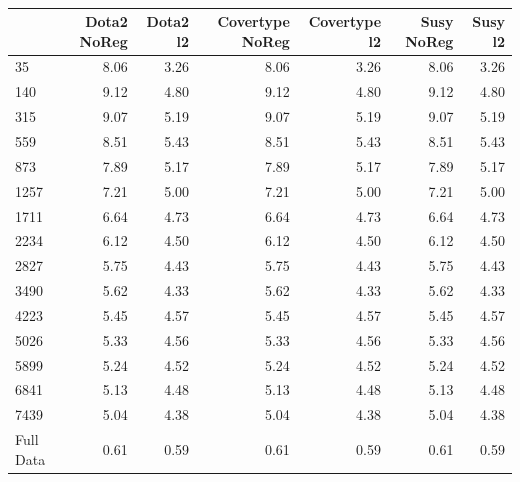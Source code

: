             \begin{table}[!htb]
                \centering
                \caption{}
                \label{tab:std_std_005}
                \begin{tabular}{l||rr|rr|rr}
                \toprule
                {} &  Dota2 NoReg &  Dota2 l2 &  Covertype NoReg &  Covertype l2 &  Susy NoReg &  Susy l2 \\
                \midrule
                35    &         8.06 &      3.26 &             8.06 &          3.26 &        8.06 &     3.26 \\
                140   &         9.12 &      4.80 &             9.12 &          4.80 &        9.12 &     4.80 \\
                315   &         9.07 &      5.19 &             9.07 &          5.19 &        9.07 &     5.19 \\
                559   &         8.51 &      5.43 &             8.51 &          5.43 &        8.51 &     5.43 \\
                873   &         7.89 &      5.17 &             7.89 &          5.17 &        7.89 &     5.17 \\
                1257  &         7.21 &      5.00 &             7.21 &          5.00 &        7.21 &     5.00 \\
                1711  &         6.64 &      4.73 &             6.64 &          4.73 &        6.64 &     4.73 \\
                2234  &         6.12 &      4.50 &             6.12 &          4.50 &        6.12 &     4.50 \\
                2827  &         5.75 &      4.43 &             5.75 &          4.43 &        5.75 &     4.43 \\
                3490  &         5.62 &      4.33 &             5.62 &          4.33 &        5.62 &     4.33 \\
                4223  &         5.45 &      4.57 &             5.45 &          4.57 &        5.45 &     4.57 \\
                5026  &         5.33 &      4.56 &             5.33 &          4.56 &        5.33 &     4.56 \\
                5899  &         5.24 &      4.52 &             5.24 &          4.52 &        5.24 &     4.52 \\
                6841  &         5.13 &      4.48 &             5.13 &          4.48 &        5.13 &     4.48 \\
                7439  &         5.04 &      4.38 &             5.04 &          4.38 &        5.04 &     4.38 \\
                Full Data &         0.61 &      0.59 &             0.61 &          0.59 &        0.61 &     0.59 \\
                \bottomrule
                \end{tabular}
                \end{table}
                
\label{sec:apdx:table}

